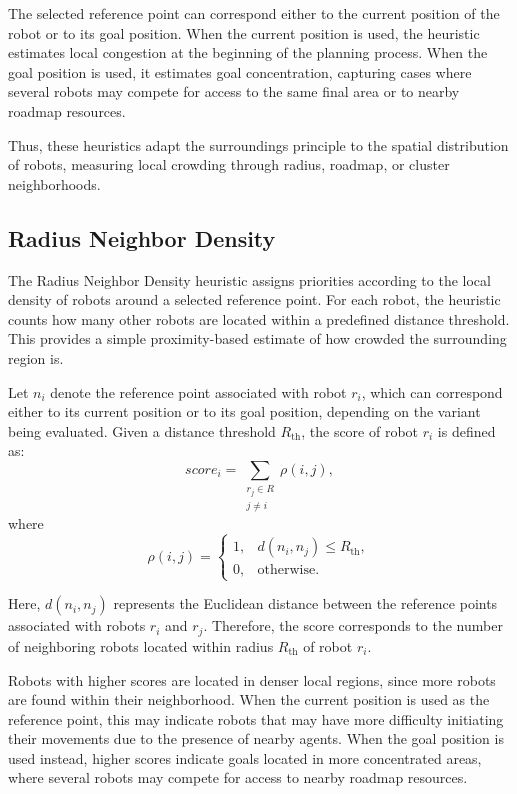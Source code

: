 The selected reference point can correspond either to the current position of the robot or to its
goal position. When the current position is used, the heuristic estimates local congestion at the
beginning of the planning process. When the goal position is used, it estimates goal concentration,
capturing cases where several robots may compete for access to the same final area or to nearby
roadmap resources.

Thus, these heuristics adapt the surroundings principle to the spatial distribution of robots,
measuring local crowding through radius, roadmap, or cluster neighborhoods.

\subsection{Radius Neighbor Density}
\label{subsec:radius_neighbor_density}
\hspace{\parindent}
The Radius Neighbor Density heuristic assigns priorities according to the local density of robots around a selected reference point. For each robot, the heuristic counts how many other robots are located within a predefined distance threshold. This provides a simple proximity-based estimate of how crowded the surrounding region is.

Let $n_i$ denote the reference point associated with robot $r_i$, which can correspond either to its current position or to its goal position, depending on the variant being evaluated. Given a distance threshold $R_{\text{th}}$, the score of robot $r_i$ is defined as:
\begin{equation}
    score_i =
    \sum_{\substack{r_j \in R \\ j \neq i}}
    \rho(i,j),
\end{equation}
where
\begin{equation}
\rho(i,j)=
\begin{cases}
1, & d(n_i,n_j) \leq R_{\text{th}}, \\
0, & \text{otherwise}.
\end{cases}
\end{equation}

Here, $d(n_i,n_j)$ represents the Euclidean distance between the reference points associated with robots $r_i$ and $r_j$. Therefore, the score corresponds to the number of neighboring robots located within radius $R_{\text{th}}$ of robot $r_i$.

Robots with higher scores are located in denser local regions, since more robots are found within their neighborhood. When the current position is used as the reference point, this may indicate robots that may have more difficulty initiating their movements due to the presence of nearby agents. When the goal position is used instead, higher scores indicate goals located in more concentrated areas, where several robots may compete for access to nearby roadmap resources.

